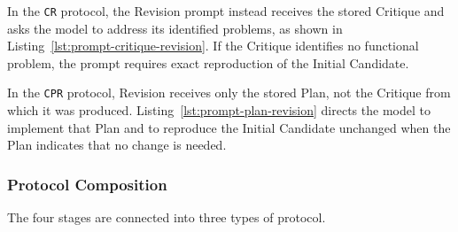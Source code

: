 \noindent\begin{minipage}{\columnwidth}

\end{minipage}

In the \texttt{CR} protocol, the Revision prompt instead receives the stored Critique and asks the model to address its identified problems, as shown in Listing~\ref{lst:prompt-critique-revision}.
If the Critique identifies no functional problem, the prompt requires exact reproduction of the Initial Candidate.

\noindent\begin{minipage}{\columnwidth}

\end{minipage}

In the \texttt{CPR} protocol, Revision receives only the stored Plan, not the Critique from which it was produced.
Listing~\ref{lst:prompt-plan-revision} directs the model to implement that Plan and to reproduce the Initial Candidate unchanged when the Plan indicates that no change is needed.

\noindent\begin{minipage}{\columnwidth}

\end{minipage}

\subsubsection{Protocol Composition}

The four stages are connected into three types of protocol.

